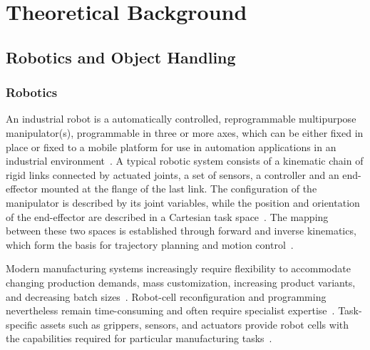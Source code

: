 \section{Theoretical Background}
\label{sec:theoretical_background}

\subsection{Robotics and Object Handling}
\label{subsec:robotics_and_handling}

\subsubsection{Robotics}
\label{subsubsec:robotics}

An industrial robot is a automatically controlled, reprogrammable multipurpose manipulator(s), programmable in
three or more axes, which can be either fixed in place or fixed to a mobile platform for use
in automation applications in an industrial environment~\cite{Lee2022Vocabulary}. A typical robotic system consists of a kinematic chain of rigid links
connected by actuated joints, a set of sensors, a controller and an end-effector mounted at the flange of the last link. The configuration of the
manipulator is described by its joint variables, while the position and orientation of the end-effector are described in a Cartesian task
space~\cite{Malik2022A}. The mapping between these two spaces is established through forward and inverse kinematics, which form the basis for
trajectory planning and motion control~\cite{Singh2022Kinematics}.

Modern manufacturing systems increasingly require flexibility to accommodate
changing production demands, mass customization, increasing product variants,
and decreasing batch sizes~\cite{Wiese2022Flexible,Bilancia2023An}. Robot-cell
reconfiguration and programming nevertheless remain time-consuming and often
require specialist expertise~\cite{Wiese2022Flexible}. Task-specific assets such
as grippers, sensors, and actuators provide robot cells with the capabilities
required for particular manufacturing tasks~\cite{Wiese2022Flexible}.


